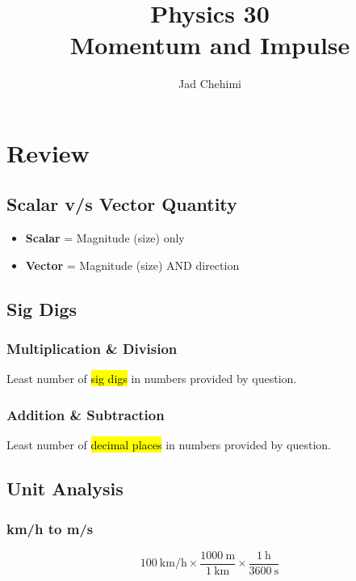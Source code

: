 \documentclass[a4paper,12pt]{article}
\title{Physics 30 \\ Momentum and Impulse}
\author{Jad Chehimi}
\begin{document}
\maketitle

\tableofcontents

\pagebreak

\section{Review}
\subsection{Scalar v/s Vector Quantity}
\begin{itemize}
    \item{\textbf{Scalar} = Magnitude (size) only}
    \item{\textbf{Vector} = Magnitude (size) AND direction}
\end{itemize}

\subsection{Sig Digs}
\subsubsection{Multiplication \& Division}
Least number of \hl{sig digs} in numbers provided by question.

\subsubsection{Addition \& Subtraction}
Least number of \hl{decimal places} in numbers provided by question.

\subsection{Unit Analysis}
\subsubsection{km/h to m/s}
$$\SI{100}{\km\per\hour} \times \frac{\SI{1000}{\m}}{\SI{1}{\km}} \times \frac{\SI{1}{\hour}}{\SI{3600}{\second}}$$
\end{document}
